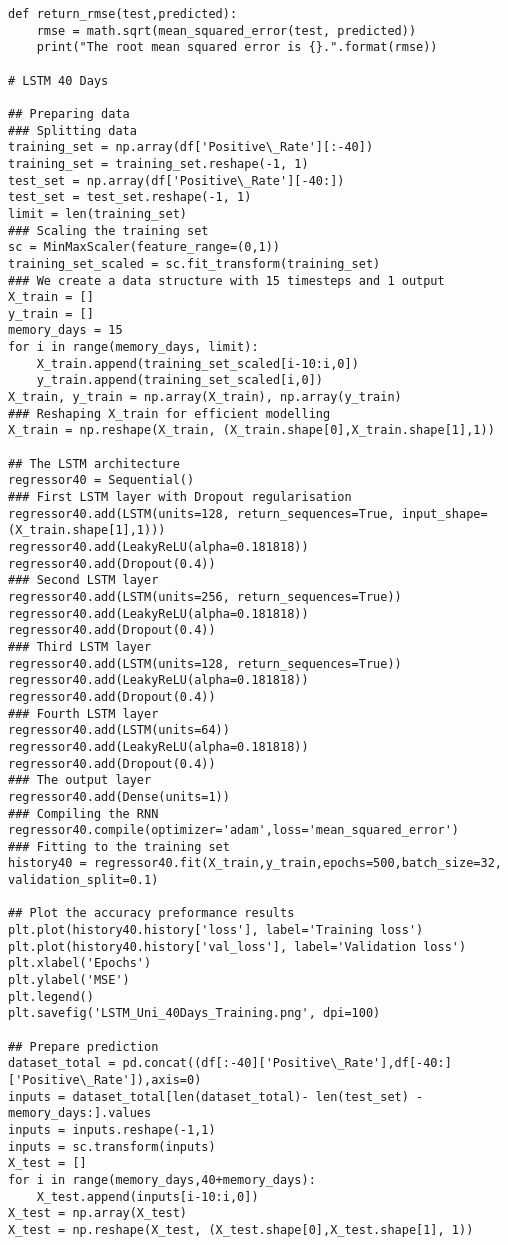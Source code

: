 \begin{appendices}
\begin{verbatim}
def return_rmse(test,predicted):
    rmse = math.sqrt(mean_squared_error(test, predicted))
    print("The root mean squared error is {}.".format(rmse))

# LSTM 40 Days

## Preparing data
### Splitting data
training_set = np.array(df['Positive\_Rate'][:-40])
training_set = training_set.reshape(-1, 1)
test_set = np.array(df['Positive\_Rate'][-40:])
test_set = test_set.reshape(-1, 1)
limit = len(training_set)
### Scaling the training set
sc = MinMaxScaler(feature_range=(0,1))
training_set_scaled = sc.fit_transform(training_set)
### We create a data structure with 15 timesteps and 1 output
X_train = []
y_train = []
memory_days = 15
for i in range(memory_days, limit):
    X_train.append(training_set_scaled[i-10:i,0])
    y_train.append(training_set_scaled[i,0])
X_train, y_train = np.array(X_train), np.array(y_train)
### Reshaping X_train for efficient modelling
X_train = np.reshape(X_train, (X_train.shape[0],X_train.shape[1],1))

## The LSTM architecture
regressor40 = Sequential()
### First LSTM layer with Dropout regularisation
regressor40.add(LSTM(units=128, return_sequences=True, input_shape=(X_train.shape[1],1)))
regressor40.add(LeakyReLU(alpha=0.181818))
regressor40.add(Dropout(0.4))
### Second LSTM layer
regressor40.add(LSTM(units=256, return_sequences=True))
regressor40.add(LeakyReLU(alpha=0.181818))
regressor40.add(Dropout(0.4))
### Third LSTM layer
regressor40.add(LSTM(units=128, return_sequences=True))
regressor40.add(LeakyReLU(alpha=0.181818))
regressor40.add(Dropout(0.4))
### Fourth LSTM layer
regressor40.add(LSTM(units=64))
regressor40.add(LeakyReLU(alpha=0.181818))
regressor40.add(Dropout(0.4))
### The output layer
regressor40.add(Dense(units=1))
### Compiling the RNN
regressor40.compile(optimizer='adam',loss='mean_squared_error')
### Fitting to the training set
history40 = regressor40.fit(X_train,y_train,epochs=500,batch_size=32, validation_split=0.1)

## Plot the accuracy preformance results
plt.plot(history40.history['loss'], label='Training loss')
plt.plot(history40.history['val_loss'], label='Validation loss')
plt.xlabel('Epochs')
plt.ylabel('MSE')
plt.legend()
plt.savefig('LSTM_Uni_40Days_Training.png', dpi=100)

## Prepare prediction
dataset_total = pd.concat((df[:-40]['Positive\_Rate'],df[-40:]['Positive\_Rate']),axis=0)
inputs = dataset_total[len(dataset_total)- len(test_set) - memory_days:].values
inputs = inputs.reshape(-1,1)
inputs = sc.transform(inputs)
X_test = []
for i in range(memory_days,40+memory_days):
    X_test.append(inputs[i-10:i,0])
X_test = np.array(X_test)
X_test = np.reshape(X_test, (X_test.shape[0],X_test.shape[1], 1))


\end{verbatim}
\end{appendices}
